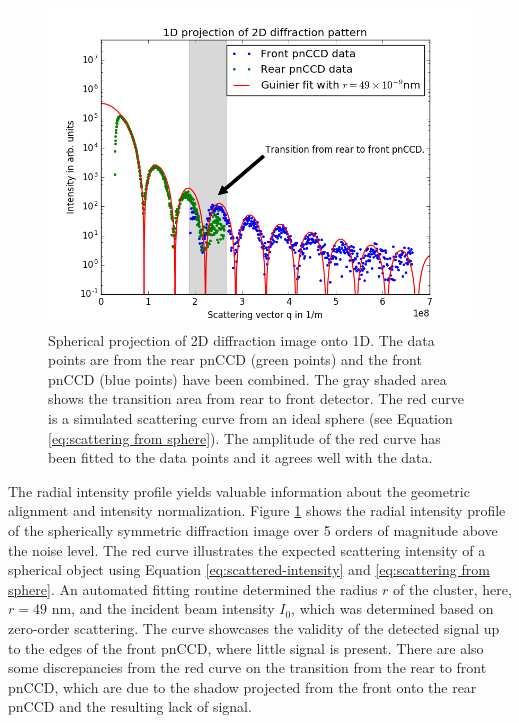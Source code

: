 \begin{figure}
	\centering
		\includegraphics[height=0.50\textwidth]{images/pnCCD-1d-sum.png}
	\caption[Spherical projection of 2D diffraction image onto 1D.]{Spherical projection of 2D diffraction image onto 1D. The data points are from the rear pnCCD (green points) and the front pnCCD (blue points) have been combined. The gray shaded area shows the transition area from rear to front detector. The red curve is a simulated scattering curve from an ideal sphere (see Equation \eqref{eq:scattering from sphere}). The amplitude of the red curve has been fitted to the data points and it agrees well with the data.}
	\label{fig:pnCCD-1d-sum}
\end{figure}
The radial intensity profile yields valuable information about the geometric alignment and intensity normalization. Figure \ref{fig:pnCCD-1d-sum} shows the radial intensity profile of the spherically symmetric diffraction image over 5 orders of magnitude above the noise level. The red curve illustrates the expected scattering intensity of a spherical object using Equation \eqref{eq:scattered-intensity} and \eqref{eq:scattering from sphere}. An automated fitting routine determined the radius $r$ of the cluster, here, $r=49$ nm, and the incident beam intensity $I_{0}$, which was determined based on zero-order scattering. The curve showcases the validity of the detected signal up to the edges of the front pnCCD, where little signal is present. There are also some discrepancies from the red curve on the transition from the rear to front pnCCD, which are due to the shadow projected from the front onto the rear pnCCD and the resulting lack of signal.
%
%
%
